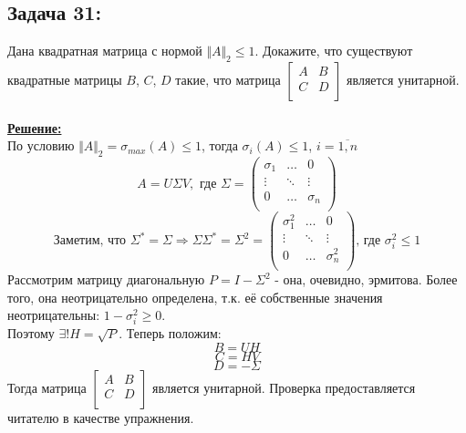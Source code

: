 \documentclass[a4paper,12pt,titlepage,final]{article}
\begin{document}
\subsection*{Задача 31:}
\noindent Дана квадратная матрица с нормой $\Vert A \Vert_2 \leq 1$. Докажите, что существуют квадратные матрицы $B$, $C$, $D$ такие, что матрица 
$\left[ \begin{smallmatrix}
        A & B \\
        C & D \\
        \end{smallmatrix}
\right]$ является унитарной.\\ \\
\textbf{\underline{Решение:}} \\
По условию $\Vert A \Vert_2 = \sigma_{max}(A) \leq 1$, тогда $\sigma_i(A) \leq 1$, $i = \overline{1,n}$
$$A = U\Sigma V, \text{ где } \Sigma = 
\begin{pmatrix}
    \sigma_1 & \ldots & 0 \\
    \vdots & \ddots & \vdots \\
    0 & \ldots & \sigma_n \\
\end{pmatrix}
$$
$$
\text{Заметим, что } \Sigma^* = \Sigma \Rightarrow \Sigma\Sigma^* = \Sigma^2 = 
\begin{pmatrix}
    \sigma_1^2 & \ldots & 0 \\
    \vdots & \ddots & \vdots \\
    0 & \ldots & \sigma_n^2 \\
\end{pmatrix}
\text{, где } \sigma_i^2 \leq 1 $$
Рассмотрим матрицу диагональную $P = I - \Sigma^2$ - она, очевидно, эрмитова. Более того, она неотрицательно определена, т.к. её собственные значения неотрицательны: $1 - \sigma_i^2 \geq 0$. \\
Поэтому $\exists! H = \sqrt{P}$. Теперь положим:
$$ B = UH $$
$$ C = HV $$
$$ D = -\Sigma $$
Тогда матрица 
$\left[ \begin{smallmatrix}
        A & B \\
        C & D \\
        \end{smallmatrix}
\right]$ является унитарной. Проверка предоставляется читателю в качестве упражнения. \blacksquare \\ \\ \\
\end{document}
